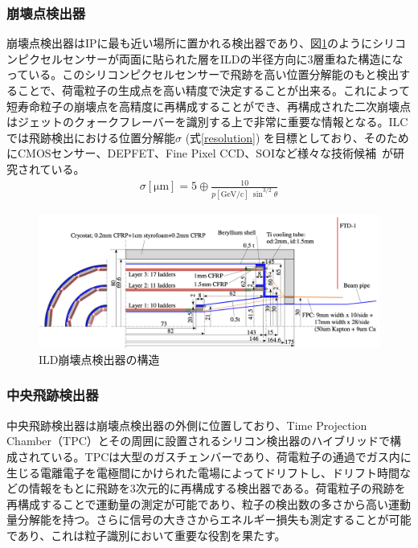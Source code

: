 \subsubsection{崩壊点検出器}
崩壊点検出器はIPに最も近い場所に置かれる検出器であり、図\ref{vertexdetector}のようにシリコンピクセルセンサーが両面に貼られた層をILDの半径方向に3層重ねた構造になっている。このシリコンピクセルセンサーで飛跡を高い位置分解能のもと検出することで、荷電粒子の生成点を高い精度で決定することが出来る。これによって短寿命粒子の崩壊点を高精度に再構成することができ、再構成された二次崩壊点はジェットのクォークフレーバーを識別する上で非常に重要な情報となる。ILCでは飛跡検出における位置分解能$\sigma$ (式\ref{resolution}) を目標としており、そのためにCMOSセンサー、DEPFET、Fine Pixel CCD、SOIなど様々な技術候補~\cite{tdr2}が研究されている。
\begin{align}
\label{resolution}
\sigma [\mathrm{\mu m}] = 5 \oplus \frac{10} {p[\mathrm{GeV/c}] \ {\sin^{3/2}{\theta}}}
\end{align}
\begin{figure}[H]
	\begin{center}
 \includegraphics[keepaspectratio, scale=0.3]
 	{Figure/Introduction/vertexdetector.png}
 		\caption {ILD崩壊点検出器の構造}
 		\label{vertexdetector}
	\end{center}
\end{figure}
\subsubsection{中央飛跡検出器}
中央飛跡検出器は崩壊点検出器の外側に位置しており、Time Projection Chamber（TPC）とその周囲に設置されるシリコン検出器のハイブリッドで構成されている。TPCは大型のガスチェンバーであり、荷電粒子の通過でガス内に生じる電離電子を電極間にかけられた電場によってドリフトし、ドリフト時間などの情報をもとに飛跡を3次元的に再構成する検出器である。荷電粒子の飛跡を再構成することで運動量の測定が可能であり、粒子の検出数の多さから高い運動量分解能を持つ。さらに信号の大きさからエネルギー損失も測定することが可能であり、これは粒子識別において重要な役割を果たす。
